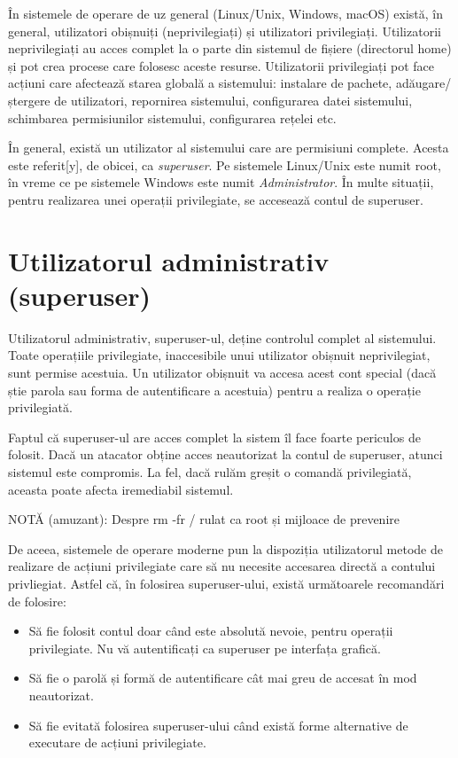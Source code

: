 În sistemele de operare de uz general (Linux/Unix, Windows, macOS) există, în
general, utilizatori obișnuiți (neprivilegiați) și utilizatori privilegiați.
Utilizatorii neprivilegiați au acces complet la o parte din sistemul de fișiere
(directorul home) și pot crea procese care folosesc aceste resurse. Utilizatorii
privilegiați pot face acțiuni care afectează starea globală a sistemului:
instalare de pachete, adăugare/ștergere de utilizatori, repornirea sistemului,
configurarea datei sistemului, schimbarea permisiunilor sistemului, configurarea
rețelei etc.

În general, există un utilizator al sistemului care are permisiuni complete.
Acesta este referit[y], de obicei, ca \textit{superuser}. Pe sistemele
Linux/Unix este numit root, în vreme ce pe sistemele Windows este numit
\textit{Administrator}. În multe situații, pentru realizarea unei operații
privilegiate, se accesează contul de superuser.

\section{Utilizatorul administrativ (superuser)}
\label{sec:users-superuser}

Utilizatorul administrativ, superuser-ul, deține controlul complet al
sistemului. Toate operațiile privilegiate, inaccesibile unui utilizator obișnuit
neprivilegiat, sunt permise acestuia. Un utilizator obișnuit va accesa acest
cont special (dacă știe parola sau forma de autentificare a acestuia) pentru a
realiza o operație privilegiată.

Faptul că superuser-ul are acces complet la sistem îl face foarte periculos de
folosit. Dacă un atacator obține acces neautorizat la contul de superuser,
atunci sistemul este compromis. La fel, dacă rulăm greșit o comandă
privilegiată, aceasta poate afecta iremediabil sistemul.

NOTĂ (amuzant): Despre rm -fr / rulat ca root și mijloace de prevenire

De aceea, sistemele de operare moderne pun la dispoziția utilizatorul metode de
realizare de acțiuni privilegiate care să nu necesite accesarea directă a
contului privliegiat. Astfel că, în folosirea superuser-ului, există următoarele
recomandări de folosire:

\begin{itemize}
	\item Să fie folosit contul doar când este absolută nevoie, pentru
		operații privilegiate. Nu vă autentificați ca superuser pe
		interfața grafică.
	\item Să fie o parolă și formă de autentificare cât mai greu de accesat
		în mod neautorizat.
	\item Să fie evitată folosirea superuser-ului când există forme
		alternative de executare de acțiuni privilegiate.
\end{itemize}

